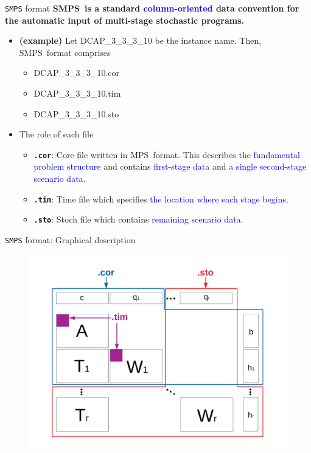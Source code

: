 \documentclass{beamer}
\newcommand{\smps}{\textsf{SMPS}}
\newcommand{\mps}{\textsf{MPS}}
\begin{document}
	\begin{frame}{\texttt{SMPS} format}
		\textbf{\smps\ is a standard \textcolor{blue}{column-oriented} data convention for the automatic input of multi-stage stochastic programs.} 
		\begin{itemize}
			\item \textbf{(example)} Let DCAP\_3\_3\_3\_10 be the instance name. Then, \smps\ format comprises
			\begin{itemize}
				\item DCAP\_3\_3\_3\_10.cor
				\item DCAP\_3\_3\_3\_10.tim
				\item DCAP\_3\_3\_3\_10.sto
			\end{itemize}
			\item The role of each file
			\begin{itemize}
				\item \textbf{\texttt{.cor}}: Core file written in \mps\ format. This describes the \textcolor{blue}{fundamental problem structure} and contains \textcolor{blue}{first-stage data} and \textcolor{blue}{a single second-stage scenario data.}
				\item \textbf{\texttt{.tim}}: Time file which specifies \textcolor{blue}{the location where each stage begins.}
				\item \textbf{\texttt{.sto}}: Stoch file which contains \textcolor{blue}{remaining scenario data.}
			\end{itemize}
		\end{itemize}
	\end{frame}
	
	\begin{frame}{\texttt{SMPS} format: Graphical description}
		\vspace{-0.35cm}
		\begin{figure}
			\begin{center}
				\includegraphics[width=\textwidth]{SMPS_description_slide}
			\end{center}
		\end{figure}
	\end{frame}
\end{document}
